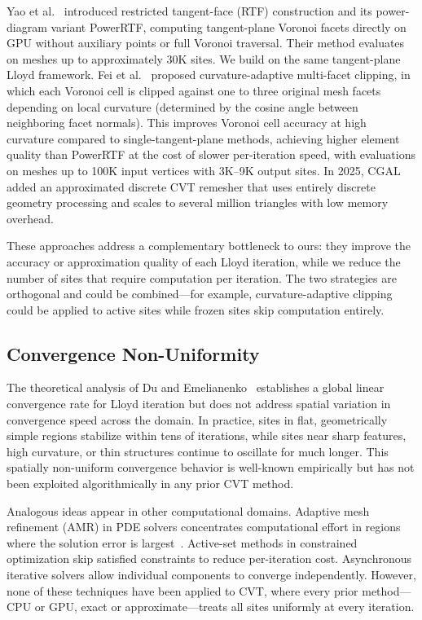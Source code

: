 Yao et al.~\cite{yao2023rtf} introduced restricted tangent-face (RTF) construction and its power-diagram variant PowerRTF, computing tangent-plane Voronoi facets directly on GPU without auxiliary points or full Voronoi traversal. Their method evaluates on meshes up to approximately 30K sites. We build on the same tangent-plane Lloyd framework. Fei et al.~\cite{fei2025adaptive} proposed curvature-adaptive multi-facet clipping, in which each Voronoi cell is clipped against one to three original mesh facets depending on local curvature (determined by the cosine angle between neighboring facet normals). This improves Voronoi cell accuracy at high curvature compared to single-tangent-plane methods, achieving higher element quality than PowerRTF at the cost of slower per-iteration speed, with evaluations on meshes up to 100K input vertices with 3K--9K output sites. In 2025, CGAL added an approximated discrete CVT remesher that uses entirely discrete geometry processing and scales to several million triangles with low memory overhead.

These approaches address a complementary bottleneck to ours: they improve the accuracy or approximation quality of each Lloyd iteration, while we reduce the number of sites that require computation per iteration. The two strategies are orthogonal and could be combined---for example, curvature-adaptive clipping could be applied to active sites while frozen sites skip computation entirely.

\subsection{Convergence Non-Uniformity}

The theoretical analysis of Du and Emelianenko~\cite{du2006acceleration} establishes a global linear convergence rate for Lloyd iteration but does not address spatial variation in convergence speed across the domain. In practice, sites in flat, geometrically simple regions stabilize within tens of iterations, while sites near sharp features, high curvature, or thin structures continue to oscillate for much longer. This spatially non-uniform convergence behavior is well-known empirically but has not been exploited algorithmically in any prior CVT method.

Analogous ideas appear in other computational domains. Adaptive mesh refinement (AMR) in PDE solvers concentrates computational effort in regions where the solution error is largest~\cite{berger1984amr}. Active-set methods in constrained optimization skip satisfied constraints to reduce per-iteration cost. Asynchronous iterative solvers allow individual components to converge independently. However, none of these techniques have been applied to CVT, where every prior method---CPU or GPU, exact or approximate---treats all sites uniformly at every iteration.

